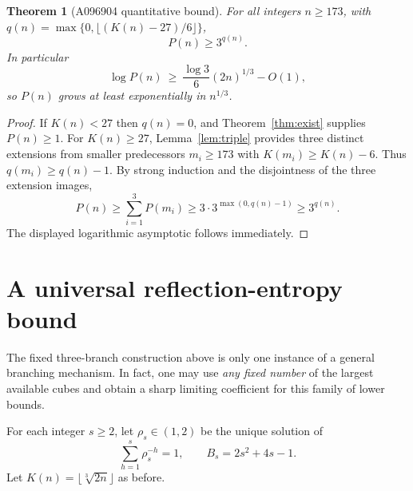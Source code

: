 \documentclass[10pt]{article}
\newtheorem{theorem}{Theorem}
\begin{document}
\begin{theorem}[A096904 quantitative bound]\label{thm:many}
For all integers $n\ge173$, with
$q(n)=\max\{0,\lfloor(K(n)-27)/6\rfloor\}$,
\[
\boxed{P(n)\ge3^{q(n)}}.
\]
In particular
\[
\log P(n)\ \ge\
\frac{\log3}{6}(2n)^{1/3}-O(1),
\]
so $P(n)$ grows at least exponentially in $n^{1/3}$.
\end{theorem}
\begin{proof}
If $K(n)<27$ then $q(n)=0$, and
Theorem~\ref{thm:exist} supplies $P(n)\ge1$.
For $K(n)\ge27$, Lemma~\ref{lem:triple}
provides three distinct extensions from smaller
predecessors $m_i\ge173$ with
$K(m_i)\ge K(n)-6$. Thus
$q(m_i)\ge q(n)-1$.
By strong induction and the disjointness of the
three extension images,
\[
P(n)\ge\sum_{i=1}^{3}P(m_i)
\ge3\cdot3^{\max(0,q(n)-1)}
\ge3^{q(n)}.
\]
The displayed logarithmic asymptotic follows immediately.
\end{proof}


\section{A universal reflection-entropy bound}\label{sec:entropy}
The fixed three-branch construction above is only
one instance of a general branching mechanism. In fact,
one may use \emph{any fixed number} of the largest
available cubes and obtain a sharp limiting coefficient
for this family of lower bounds.

For each integer $s\ge2$, let $\rho_s\in(1,2)$
be the unique solution of
\begin{equation}\label{eq:rho}
\sum_{h=1}^{s}\rho_s^{-h}=1,
\qquad
B_s=2s^2+4s-1.
\end{equation}
Let $K(n)=\lfloor\sqrt[3]{2n}\rfloor$ as before.
\end{document}

